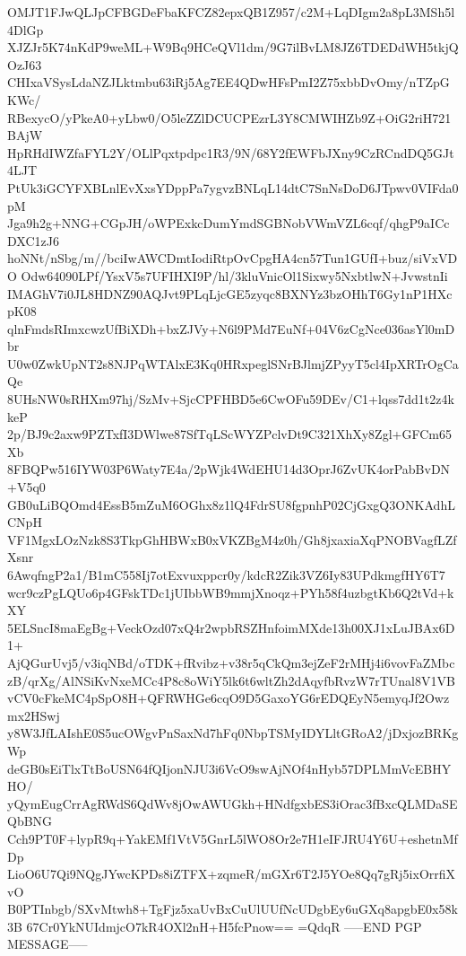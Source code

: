 OMJT1FJwQLJpCFBGDeFbaKFCZ82epxQB1Z957/c2M+LqDIgm2a8pL3MSh5l4DlGp
XJZJr5K74nKdP9weML+W9Bq9HCeQVl1dm/9G7ilBvLM8JZ6TDEDdWH5tkjQOzJ63
CHIxaVSysLdaNZJLktmbu63iRj5Ag7EE4QDwHFsPmI2Z75xbbDvOmy/nTZpGKWc/
RBexycO/yPkeA0+yLbw0/O5leZZlDCUCPEzrL3Y8CMWIHZb9Z+OiG2riH721BAjW
HpRHdIWZfaFYL2Y/OLlPqxtpdpc1R3/9N/68Y2fEWFbJXny9CzRCndDQ5GJt4LJT
PtUk3iGCYFXBLnlEvXxsYDppPa7ygvzBNLqL14dtC7SnNsDoD6JTpwv0VIFda0pM
Jga9h2g+NNG+CGpJH/oWPExkcDumYmdSGBNobVWmVZL6cqf/qhgP9aICcDXC1zJ6
hoNNt/nSbg/m//bciIwAWCDmtIodiRtpOvCpgHA4cn57Tun1GUfI+buz/siVxVDO
Odw64090LPf/YsxV5s7UFIHXI9P/hl/3kluVnicOl1Sixwy5NxbtlwN+JvwstnIi
IMAGhV7i0JL8HDNZ90AQJvt9PLqLjcGE5zyqc8BXNYz3bzOHhT6Gy1nP1HXcpK08
qlnFmdsRImxcwzUfBiXDh+bxZJVy+N6l9PMd7EuNf+04V6zCgNce036asYl0mDbr
U0w0ZwkUpNT2s8NJPqWTAlxE3Kq0HRxpeglSNrBJlmjZPyyT5cl4IpXRTrOgCaQe
8UHsNW0sRHXm97hj/SzMv+SjcCPFHBD5e6CwOFu59DEv/C1+lqss7dd1t2z4kkeP
2p/BJ9c2axw9PZTxfI3DWlwe87SfTqLScWYZPclvDt9C321XhXy8Zgl+GFCm65Xb
8FBQPw516IYW03P6Waty7E4a/2pWjk4WdEHU14d3OprJ6ZvUK4orPabBvDN+V5q0
GB0uLiBQOmd4EssB5mZuM6OGhx8z1lQ4FdrSU8fgpnhP02CjGxgQ3ONKAdhLCNpH
VF1MgxLOzNzk8S3TkpGhHBWxB0xVKZBgM4z0h/Gh8jxaxiaXqPNOBVagfLZfXsnr
6AwqfngP2a1/B1mC558Ij7otExvuxppcr0y/kdcR2Zik3VZ6Iy83UPdkmgfHY6T7
wcr9czPgLQUo6p4GFskTDc1jUIbbWB9mmjXnoqz+PYh58f4uzbgtKb6Q2tVd+kXY
5ELSncI8maEgBg+VeckOzd07xQ4r2wpbRSZHnfoimMXde13h00XJ1xLuJBAx6D1+
AjQGurUvj5/v3iqNBd/oTDK+fRvibz+v38r5qCkQm3ejZeF2rMHj4i6vovFaZMbc
zB/qrXg/AlNSiKvNxeMCc4P8c8oWiY5lk6t6wltZh2dAqyfbRvzW7rTUnal8V1VB
vCV0cFkeMC4pSpO8H+QFRWHGe6cqO9D5GaxoYG6rEDQEyN5emyqJf2Owzmx2HSwj
y8W3JfLAIshE0S5ucOWgvPnSaxNd7hFq0NbpTSMyIDYLltGRoA2/jDxjozBRKgWp
deGB0sEiTlxTtBoUSN64fQIjonNJU3i6VcO9swAjNOf4nHyb57DPLMmVcEBHYHO/
yQymEugCrrAgRWdS6QdWv8jOwAWUGkh+HNdfgxbES3iOrac3fBxcQLMDaSEQbBNG
Cch9PT0F+lypR9q+YakEMf1VtV5GnrL5lWO8Or2e7H1eIFJRU4Y6U+eshetnMfDp
LioO6U7Qi9NQgJYwcKPDs8iZTFX+zqmeR/mGXr6T2J5YOe8Qq7gRj5ixOrrfiXvO
B0PTInbgb/SXvMtwh8+TgFjz5xaUvBxCuUlUUfNcUDgbEy6uGXq8apgbE0x58k3B
67Cr0YkNUIdmjcO7kR4OXl2nH+H5fcPnow==
=QdqR
-----END PGP MESSAGE-----

